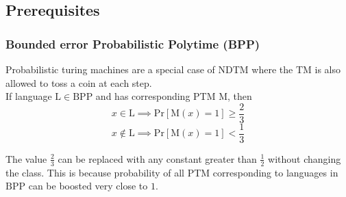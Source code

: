 \documentclass[../main.tex]{subfiles}
\begin{document}
\subsection{Prerequisites}

\subsubsection{Bounded error Probabilistic Polytime (BPP)}

Probabilistic turing machines are a special case of NDTM where the TM is also allowed to toss a coin at each step.\\
\noindent If language $\mathrm{L} \in \mathrm{BPP}$ and has corresponding PTM $\mathrm{M}$, then 
\begin{equation*}
    x \in \mathrm{L} \implies \mathrm{Pr}[\mathrm{M}(x) = 1] \ge \frac{2}{3}
\end{equation*}
\begin{equation*}
    x \not\in \mathrm{L} \implies \mathrm{Pr}[\mathrm{M}(x) = 1] < \frac{1}{3}
\end{equation*}

\noindent The value $\frac{2}{3}$ can be replaced with any constant greater than $\frac{1}{2}$ without changing the class. This is because probability of all PTM corresponding to languages in $\mathrm{BPP}$ can be boosted very close to $1$.
\end{document}

